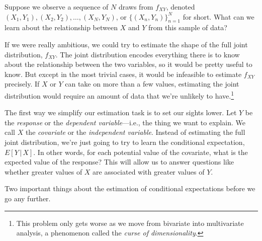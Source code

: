 \documentclass[12pt,oneside,openany]{book}
\begin{document}
Suppose we observe a sequence of \(N\) draws from \(f_{XY}\), denoted
\((X_1, Y_1), (X_2, Y_2), \ldots, (X_N, Y_N)\), or
\(\{(X_n, Y_n)\}_{n=1}^N\) for short. What can we learn about the
relationship between \(X\) and \(Y\) from this sample of data?

If we were really ambitious, we could try to estimate the shape of the
full joint distribution, \(f_{XY}\). The joint distribution encodes
everything there is to know about the relationship between the two
variables, so it would be pretty useful to know. But except in the most
trivial cases, it would be infeasible to estimate \(f_{XY}\) precisely.
If \(X\) or \(Y\) can take on more than a few values, estimating the
joint distribution would require an amount of data that we're unlikely
to have.\footnote{This problem only gets worse as we move from bivariate
  into multivariate analysis, a phenomenon called the \emph{curse of
  dimensionality}.}

The first way we simplify our estimation task is to set our sights
lower. Let \(Y\) be the \emph{response} or the \emph{dependent
variable}---i.e., the thing we want to explain. We call \(X\) the
\emph{covariate} or the \emph{independent variable}. Instead of
estimating the full joint distribution, we're just going to try to learn
the conditional expectation, \(E[Y \,|\, X]\). In other words, for each
potential value of the covariate, what is the expected value of the
response? This will allow us to answer questions like whether greater
values of \(X\) are associated with greater values of \(Y\).

Two important things about the estimation of conditional expectations
before we go any further.
\end{document}
